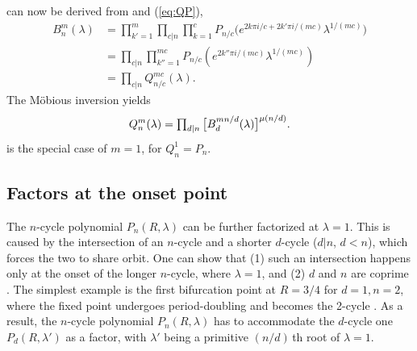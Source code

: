 \documentclass{ws-ijbc}
\begin{document}




 can now be derived from
   and (\ref{eq:QP}),
\begin{align*}
 B_n^m (\lambda)
 & = \prod_{k' = 1}^m \prod_{c | n} \prod_{k=1}^c
      P_{n/c}\big(
        e^{2k\pi i/c + 2 k' \pi i/(m c)}
        \lambda^{1/(m c)}
      \big) \\
 & = \prod_{c | n} \prod_{k''=1}^{m c}
    P_{n/c}(e^{2k''\pi i/(m c)} \lambda^{1/(m c)}) \\
 &
  = \prod_{c | n} Q_{n/c}^{m c}(\lambda).
\end{align*}
The M\"obious inversion yields
\begin{equation}
Q_n^m(\lambda)
= \textstyle\prod_{d|n} \big[
    B_d^{m n/d}(\lambda)
  \big]^{\mu(n/d)}.
\notag
\end{equation}
 is the special case of $m = 1$,
for $Q_n^1 = P_n$.









\subsection{\label{sec:origfac}%
  Factors at the onset point}


The $n$-cycle polynomial
  $P_n(R, \lambda)$
  can be further factorized at $\lambda = 1$.
%
This is caused by the intersection of an $n$-cycle
  and a shorter $d$-cycle ($d|n$, $d < n$),
  which forces the two to share orbit.
%
One can show that (1) such an intersection happens only
  at the onset of the longer $n$-cycle, where $\lambda = 1$,
%
  and (2) $d$ and $n$ are coprime \cite{blackhurst}.
%
The simplest example is the first bifurcation point
  at $R = 3/4$ for $d = 1, n = 2$,
  where the fixed point 
  undergoes period-doubling and becomes the 2-cycle .
As a result, the $n$-cycle polynomial $P_n(R, \lambda)$
  has to accommodate the $d$-cycle one $P_d(R, \lambda')$ as a factor,
  with $\lambda'$ being a primitive $(n/d)\,$th root of $\lambda = 1$.
\end{document}
